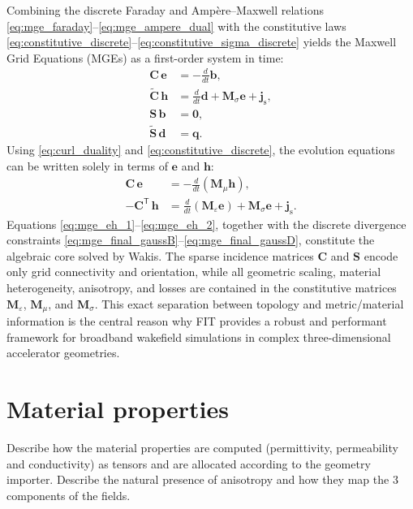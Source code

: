 Combining the discrete Faraday and Amp\`ere--Maxwell relations \eqref{eq:mge_faraday}--\eqref{eq:mge_ampere_dual} with the constitutive laws \eqref{eq:constitutive_discrete}--\eqref{eq:constitutive_sigma_discrete} yields the Maxwell Grid Equations (MGEs) as a first-order system in time:
\begin{align}
\mathbf{C}\,\mathbf{e} &= -\frac{d}{dt}\mathbf{b},
\label{eq:mge_final_faraday}\\
\tilde{\mathbf{C}}\,\mathbf{h} &= \frac{d}{dt}\mathbf{d} + \mathbf{M}_{\sigma}\mathbf{e} + \mathbf{j}_{\mathrm{s}},
\label{eq:mge_final_ampere}\\
\mathbf{S}\,\mathbf{b} &= \mathbf{0},
\label{eq:mge_final_gaussB}\\
\tilde{\mathbf{S}}\,\mathbf{d} &= \mathbf{q}.
\label{eq:mge_final_gaussD}
\end{align}
Using \eqref{eq:curl_duality} and \eqref{eq:constitutive_discrete}, the evolution equations can be written solely in terms of $\mathbf{e}$ and $\mathbf{h}$:
\begin{align}
\mathbf{C}\,\mathbf{e} &= -\frac{d}{dt}\left(\mathbf{M}_{\mu}\mathbf{h}\right),
\label{eq:mge_eh_1}\\
-\mathbf{C}^{\mathsf{T}}\,\mathbf{h} &= \frac{d}{dt}\left(\mathbf{M}_{\varepsilon}\mathbf{e}\right) + \mathbf{M}_{\sigma}\mathbf{e} + \mathbf{j}_{\mathrm{s}}.
\label{eq:mge_eh_2}
\end{align}
Equations \eqref{eq:mge_eh_1}--\eqref{eq:mge_eh_2}, together with the discrete divergence constraints \eqref{eq:mge_final_gaussB}--\eqref{eq:mge_final_gaussD}, constitute the algebraic core solved by Wakis. The sparse incidence matrices $\mathbf{C}$ and $\mathbf{S}$ encode only grid connectivity and orientation, while all geometric scaling, material heterogeneity, anisotropy, and losses are contained in the constitutive matrices $\mathbf{M}_{\varepsilon}$, $\mathbf{M}_{\mu}$, and $\mathbf{M}_{\sigma}$. This exact separation between topology and metric/material information is the central reason why FIT provides a robust and performant framework for broadband wakefield simulations in complex three-dimensional accelerator geometries.

\section{Material properties}
Describe how the material properties are computed (permittivity, permeability and conductivity) as tensors and are allocated according to the geometry importer. Describe the natural presence of anisotropy and how they map the 3 components of the fields.

